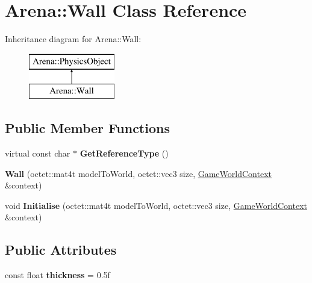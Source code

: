 \hypertarget{class_arena_1_1_wall}{\section{Arena\+:\+:Wall Class Reference}
\label{class_arena_1_1_wall}
}
Inheritance diagram for Arena\+:\+:Wall\+:\begin{figure}[H]
\begin{center}
\leavevmode
\includegraphics[height=2.000000cm]{class_arena_1_1_wall}
\end{center}
\end{figure}
\subsection*{Public Member Functions}
\begin{DoxyCompactItemize}
\item 
\hypertarget{class_arena_1_1_wall_a7fac2c618d6eb5a7050ea3c5609c1576}{virtual const char $\ast$ {\bfseries Get\+Reference\+Type} ()}\label{class_arena_1_1_wall_a7fac2c618d6eb5a7050ea3c5609c1576}

\item 
\hypertarget{class_arena_1_1_wall_ac87547293a73749a5c14540fb53f8efa}{{\bfseries Wall} (octet\+::mat4t model\+To\+World, octet\+::vec3 size, \hyperlink{struct_arena_1_1_game_world_context}{Game\+World\+Context} \&context)}\label{class_arena_1_1_wall_ac87547293a73749a5c14540fb53f8efa}

\item 
\hypertarget{class_arena_1_1_wall_ab3ae186ba60a14403854bb155ccc9347}{void {\bfseries Initialise} (octet\+::mat4t model\+To\+World, octet\+::vec3 size, \hyperlink{struct_arena_1_1_game_world_context}{Game\+World\+Context} \&context)}\label{class_arena_1_1_wall_ab3ae186ba60a14403854bb155ccc9347}

\end{DoxyCompactItemize}
\subsection*{Public Attributes}
\begin{DoxyCompactItemize}
\item 
\hypertarget{class_arena_1_1_wall_a56d15d6f8e0301b7ad27f5496bb51048}{const float {\bfseries thickness} = 0.\+5f}\label{class_arena_1_1_wall_a56d15d6f8e0301b7ad27f5496bb51048}

\end{DoxyCompactItemize}
